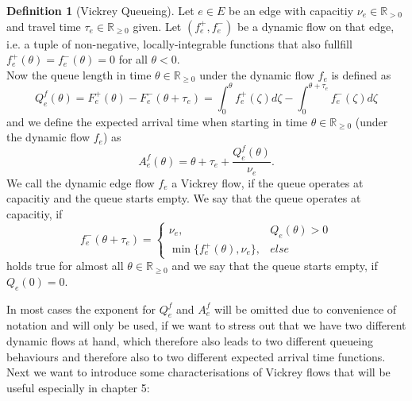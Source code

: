 \documentclass[reqno,openany]{amsbook}
\theoremstyle{definition}
\newtheorem{definition}{Definition}[chapter]
\theoremstyle{plain}
\begin{document}
\begin{definition}[Vickrey Queueing]
Let $e \in E$ be an edge with capacitiy $\nu_e \in \mathbb{R}_{> 0}$ and travel time $\tau_e \in \mathbb{R}_{\geq 0}$ given. Let $(f_e^+, f_e^-)$ be a dynamic flow on that edge, i.e. a tuple of non-negative, locally-integrable functions that also fullfill $f_e^+(\theta) = f_e^-(\theta) = 0$ for all $\theta < 0$.\\
Now the queue length in time $\theta \in \mathbb{R}_{\geq 0}$ under the dynamic flow $f_e$ is defined as 
\[ Q_e^f(\theta) = F_e^+(\theta) - F_e^-(\theta + \tau_e) = \int_0^{\theta} f_e^+(\zeta) d\zeta - \int_0^{\theta + \tau_e} f_e^-(\zeta) d\zeta \]
and we define the expected arrival time when starting in time $\theta \in \mathbb{R}_{\geq 0}$ (under the dynamic flow $f_e$) as 
\[ A_e^f(\theta) = \theta + \tau_e + \frac{Q_e^f(\theta)}{\nu_e}. \]
We call the dynamic edge flow $f_e$ a Vickrey flow, if the queue operates at capacitiy and the queue starts empty. We say that the queue operates at capacitiy, if 
\[ f_e^-(\theta + \tau_e) = \begin{cases} \nu_e, & Q_e(\theta) > 0 \\ \min\{f_e^+(\theta), \nu_e\},& else \end{cases} \]
holds true for almost all $\theta \in \mathbb{R}_{\geq 0}$ and we say that the queue starts empty, if $Q_e(0) = 0$.
\end{definition}

In most cases the exponent for $Q_e^f$ and $A_e^f$ will be omitted due to convenience of notation and will only be used, if we want to stress out that we have two different dynamic flows at hand, which therefore also leads to two different queueing behaviours and therefore also to two different expected arrival time functions. Next we want to introduce some characterisations of Vickrey flows that will be useful especially in chapter 5:
\end{document}
